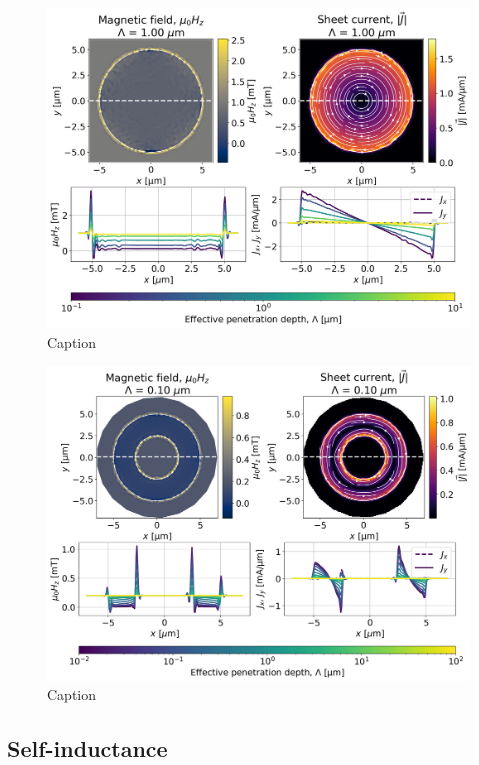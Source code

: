 \documentclass[preprint,12pt]{elsarticle}
\begin{document}
\begin{figure}
    \centering
    \includegraphics[scale=.40]{examples/images/disk/disk_uniform_field.png}
    \caption{Caption}
    \label{fig:disk_uniform_field}
\end{figure}

\begin{figure}
    \centering
    \includegraphics[scale=.40]{examples/images/ring/ring_uniform_field.png}
    \caption{Caption}
    \label{fig:ring_uniform_field}
\end{figure}

\subsection{Self-inductance}
\label{section:examples:inductance}
\end{document}
